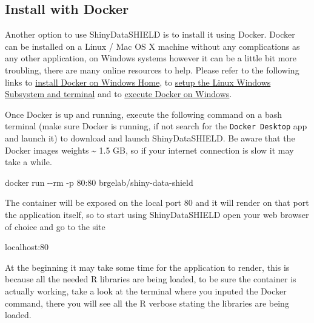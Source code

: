 \documentclass[
]{book}
\newenvironment{Shaded}{\begin{snugshade}}{\end{snugshade}}
\newcommand{\AttributeTok}[1]{\textcolor[rgb]{0.77,0.63,0.00}{#1}}
\newcommand{\ExtensionTok}[1]{#1}
\newcommand{\NormalTok}[1]{#1}
\begin{document}
\hypertarget{install-with-docker}{%
\subsection{Install with Docker}\label{install-with-docker}}

Another option to use ShinyDataSHIELD is to install it using Docker. Docker can be installed on a Linux / Mac OS X machine without any complications as any other application, on Windows systems however it can be a little bit more troubling, there are many online resources to help. Please refer to the following links to \href{https://docs.docker.com/docker-for-windows/install-windows-home/}{install Docker on Windows Home}, to \href{https://blog.nillsf.com/index.php/2020/02/17/setting-up-wsl2-windows-terminal-and-oh-my-zsh/}{setup the Linux Windows Subsystem and terminal} and to \href{https://docs.docker.com/docker-for-windows/wsl/}{execute Docker on Windows}.

Once Docker is up and running, execute the following command on a bash terminal (make sure Docker is running, if not search for the \texttt{Docker\ Desktop} app and launch it) to download and launch ShinyDataSHIELD. Be aware that the Docker images weights \textasciitilde{} 1.5 GB, so if your internet connection is slow it may take a while.

\begin{Shaded}
\begin{Highlighting}[]
\ExtensionTok{docker}\NormalTok{ run }\AttributeTok{{-}{-}rm} \AttributeTok{{-}p}\NormalTok{ 80:80 brgelab/shiny{-}data{-}shield}
\end{Highlighting}
\end{Shaded}

The container will be exposed on the local port 80 and it will render on that port the application itself, so to start using ShinyDataSHIELD open your web browser of choice and go to the site

\begin{Shaded}
\begin{Highlighting}[]
\ExtensionTok{localhost:80}
\end{Highlighting}
\end{Shaded}

At the beginning it may take some time for the application to render, this is because all the needed R libraries are being loaded, to be sure the container is actually working, take a look at the terminal where you inputed the Docker command, there you will see all the R verbose stating the libraries are being loaded.
\end{document}
